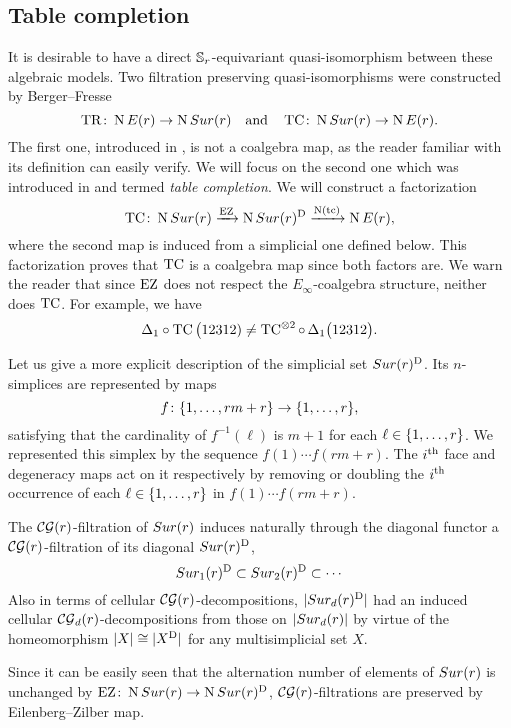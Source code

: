 
\subsection{Table completion}\label{ss:table completion}

It is desirable to have a direct $\mathbb{S}_r$-equivariant quasi-isomorphism between these algebraic models.
Two filtration preserving quasi-isomorphisms were constructed by Berger--Fresse
\[
\operatorname{TR} \colon \operatorname{N}E(r) \to \operatorname{N}Sur(r)
\quad \text{and} \quad
\operatorname{TC} \colon \operatorname{N}Sur(r) \to \operatorname{N} E(r).
\]
The first one, introduced in \cite[1$\cdot$3]{berger2004combinatorial}, is not a coalgebra map, as the reader familiar with its definition can easily verify.
We will focus on the second one which was introduced in \cite{berger2002prismatic} and termed \textit{table completion}.
We will construct a factorization
\[
\operatorname{TC} \colon \operatorname{N}Sur(r) \xrightarrow{\operatorname{EZ}} \operatorname{N}Sur(r)^{\mathrm{D}} \xrightarrow{\operatorname{N}(\operatorname{tc})} \operatorname{N} E(r),
\]
where the second map is induced from a simplicial one defined below.
This factorization proves that $\operatorname{TC}$ is a coalgebra map since both factors are.
We warn the reader that since $\operatorname{EZ}$ does not respect the $E_\infty$-coalgebra structure,
neither does $\operatorname{TC}$.
For example, we have
\[
\Delta_1 \circ \operatorname{TC}\big(12312) \neq \operatorname{TC}^{\otimes 2} \circ \, \Delta_1 \big(12312\big).
\]

Let us give a more explicit description of the simplicial set $Sur(r)^{\mathrm{D}}$.
Its $n$-simplices are represented by maps
\[
f \colon \{1,\dots,rm+r\} \to \{1,\dots,r\},
\]
satisfying that the cardinality of $f^{-1}(\ell)$ is $m+1$ for each $\ell \in \{1,\dots,r\}$.
We represented this simplex by the sequence $f(1) \dotsb f(rm+r)$.
The $i^{\mathrm{th}}$ face and degeneracy maps act on it respectively by removing or doubling the $i^{\mathrm{th}}$ occurrence of each $\ell \in \{1,\dots,r\}$ in $f(1) \dotsb f(rm+r)$.

The $\mathcal{CG}(r)$-filtration of $Sur(r)$
induces naturally through the diagonal functor a $\mathcal{CG}(r)$-filtration of its diagonal $Sur(r)^{\mathrm{D}}$,
\[
Sur_1(r)^{\mathrm{D}} \subset Sur_2(r)^{\mathrm{D}} \subset \dotsb
\]
Also in terms of cellular $\mathcal{CG}(r)$-decompositions, $\lvert Sur_d(r)^{\mathrm{D}}\rvert$ had an induced cellular $\mathcal{CG}_d(r)$-decompositions from those on $\lvert Sur_d(r)\rvert$ by virtue of the homeomorphism $\lvert X\rvert \cong \lvert X^{\mathrm{D}}\rvert$ for any multisimplicial set $X$.

Since it can be easily seen that the alternation number of elements of $Sur(r)$ is unchanged by $\operatorname{EZ} \colon \operatorname{N}Sur(r) \to \operatorname{N}Sur(r)^{\mathrm{D}}$, $\mathcal{CG}(r)$-filtrations are preserved by Eilenberg–Zilber  map.

